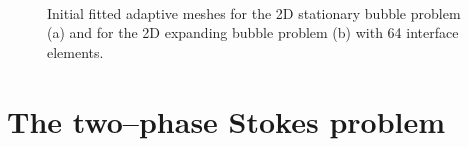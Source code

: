 \documentclass[a4paper,12pt,onecolumn]{article}
\begin{document}
\begin{figure}[htbp]
  \centering
  \quad
  \\
  \caption{Initial fitted adaptive meshes for the 2D stationary bubble problem (a) and for the 2D expanding bubble problem (b) with 64 interface elements.}
  \label{fig:meshes_adaptive}
\end{figure}

\section{The two--phase Stokes problem}\label{sec:problem}
\end{document}
